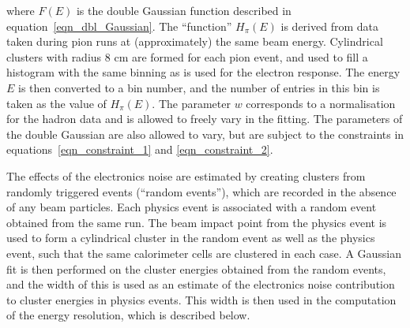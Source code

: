 where $F(E)$ is the double Gaussian function described in equation~\ref{eqn_dbl_Gaussian}. The ``function'' $H_\pi(E)$ is derived from data taken during pion runs at (approximately) the same beam energy. Cylindrical clusters with radius 8 cm are formed for each pion event, and used to fill a histogram with the same binning as is used for the electron response. The energy $E$ is then converted to a bin number, and the number of entries in this bin is taken as the value of $H_\pi(E)$. The parameter $w$ corresponds to a normalisation for the hadron data and is allowed to freely vary in the fitting. The parameters of the double Gaussian are also allowed to vary, but are subject to the constraints in equations~\ref{eqn_constraint_1} and \ref{eqn_constraint_2}.

The effects of the electronics noise are estimated by creating clusters from randomly triggered events (``random events''), which are recorded in the absence of any beam particles. Each physics event is associated with a random event obtained from the same run. The beam impact point from the physics event is used to form a cylindrical cluster in the random event as well as the physics event, such that the same calorimeter cells are clustered in each case. A Gaussian fit is then performed on the cluster energies obtained from the random events, and the width of this is used as an estimate of the electronics noise contribution to cluster energies in physics events. This width is then used in the computation of the energy resolution, which is described below. 

%
%
%
%
%
%




